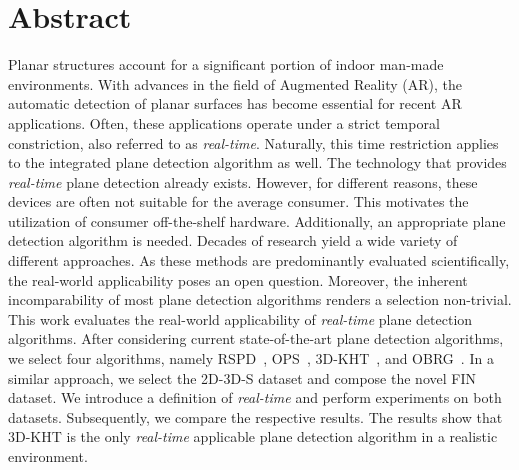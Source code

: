 \documentclass[main.tex]{subfiles}
\begin{document}
\chapter*{Abstract}
\thispagestyle{empty}
Planar structures account for a significant portion of indoor man-made environments.
With advances in the field of Augmented Reality (AR), the automatic detection of planar surfaces has become essential for recent AR applications. Often, these applications operate under a strict temporal constriction, also referred to as \textit{real-time}. Naturally, this time restriction applies to the integrated plane detection algorithm as well. The technology that provides \textit{real-time} plane detection already exists. However, for different reasons, these devices are often not suitable for the average consumer. This motivates the utilization of consumer off-the-shelf hardware. Additionally, an appropriate plane detection algorithm is needed. Decades of research yield a wide variety of different approaches. As these methods are predominantly evaluated scientifically, the real-world applicability poses an open question. Moreover, the inherent incomparability of most plane detection algorithms renders a selection non-trivial.\\
\phantom{test} This work evaluates the real-world applicability of \textit{real-time} plane detection algorithms. After considering current state-of-the-art plane detection algorithms, we select four algorithms, namely RSPD~\cite{Araújo_Oliveira_2020}, OPS~\cite{https://doi.org/10.48550/arxiv.1905.02553}, 3D-KHT~\cite{LimbergerOliveira2015HT3D}, and OBRG~\cite{Vo_Truong-Hong_Laefer_Bertolotto_2015}. In a similar approach, we select the 2D-3D-S dataset and compose the novel FIN dataset. We introduce a definition of \textit{real-time} and perform experiments on both datasets. Subsequently, we compare the respective results. The results show that 3D-KHT is the only \textit{real-time} applicable plane detection algorithm in a realistic environment.
\end{document}
